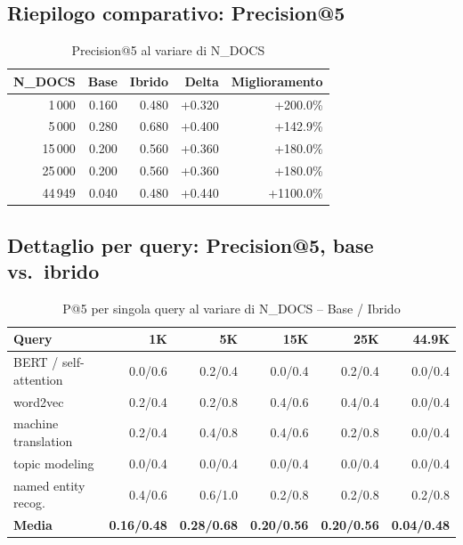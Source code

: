 \documentclass[12pt,a4paper]{article}
\begin{document}
\subsection{Riepilogo comparativo: Precision@5}

\begin{table}[H]
  \centering
  \caption{Precision@5 al variare di N\_DOCS}
  \begin{tabular}{rrrrr}
    \toprule
    \textbf{N\_DOCS} & \textbf{Base} & \textbf{Ibrido} & \textbf{Delta} & \textbf{Miglioramento} \\
    \midrule
    1\,000  & 0.160 & 0.480 & +0.320 & +200.0\% \\
    5\,000  & 0.280 & 0.680 & +0.400 & +142.9\% \\
    15\,000 & 0.200 & 0.560 & +0.360 & +180.0\% \\
    25\,000 & 0.200 & 0.560 & +0.360 & +180.0\% \\
    44\,949 & 0.040 & 0.480 & +0.440 & +1100.0\% \\
    \bottomrule
  \end{tabular}
\end{table}

\subsection{Dettaglio per query: Precision@5, base vs.\ ibrido}

\begin{table}[H]
  \centering
  \caption{P@5 per singola query al variare di N\_DOCS -- Base / Ibrido}
  \small
  \begin{tabular}{p{6cm}rrrrr}
    \toprule
    \textbf{Query} & \textbf{1K} & \textbf{5K} & \textbf{15K} & \textbf{25K} & \textbf{44.9K} \\
    \midrule
    BERT / self-attention  & 0.0/0.6 & 0.2/0.4 & 0.0/0.4 & 0.2/0.4 & 0.0/0.4 \\
    word2vec               & 0.2/0.4 & 0.2/0.8 & 0.4/0.6 & 0.4/0.4 & 0.0/0.4 \\
    machine translation    & 0.2/0.4 & 0.4/0.8 & 0.4/0.6 & 0.2/0.8 & 0.0/0.4 \\
    topic modeling         & 0.0/0.4 & 0.0/0.4 & 0.0/0.4 & 0.0/0.4 & 0.0/0.4 \\
    named entity recog.    & 0.4/0.6 & 0.6/1.0 & 0.2/0.8 & 0.2/0.8 & 0.2/0.8 \\
    \midrule
    \textbf{Media}         & \textbf{0.16/0.48} & \textbf{0.28/0.68} & \textbf{0.20/0.56} & \textbf{0.20/0.56} & \textbf{0.04/0.48} \\
    \bottomrule
  \end{tabular}
\end{table}
\end{document}
